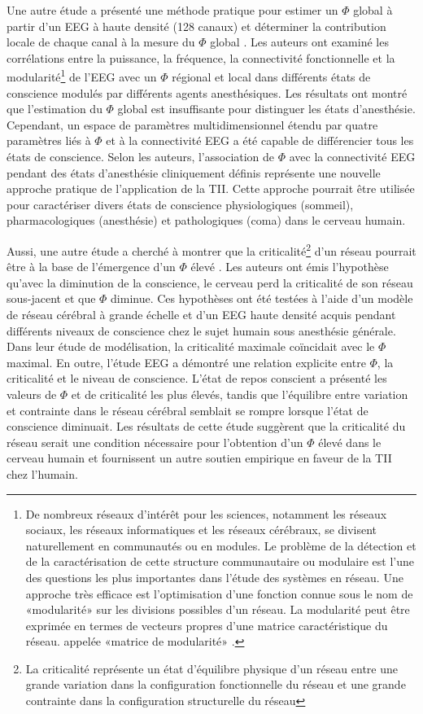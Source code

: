 Une autre étude a présenté une méthode pratique pour estimer un $\Phi$ global à partir d'un EEG à haute densité (128 canaux) et déterminer la contribution locale de chaque canal à la mesure du $\Phi$ global \citep{kim2018estimating}. 
Les auteurs ont examiné les corrélations entre la puissance, la fréquence, la connectivité fonctionnelle et la modularité\footnote{De nombreux réseaux d'intérêt pour les sciences, notamment les réseaux sociaux, les réseaux informatiques et les réseaux cérébraux, se divisent naturellement en communautés ou en modules. Le problème de la détection et de la caractérisation de cette structure communautaire ou modulaire est l'une des questions les plus importantes dans l'étude des systèmes en réseau. Une approche très efficace est l'optimisation d'une fonction connue sous le nom de «modularité» sur les divisions possibles d'un réseau. La modularité peut être exprimée en termes de vecteurs propres d'une matrice caractéristique du réseau. appelée «matrice de modularité» \citep{newman2006modularity}.} de l'EEG avec un $\Phi$ régional et local dans différents états de conscience modulés par différents agents anesthésiques. 
Les résultats ont montré que l'estimation du $\Phi$ global est insuffisante pour distinguer les états d'anesthésie. 
Cependant, un espace de paramètres multidimensionnel étendu par quatre paramètres liés à $\Phi$ et à la connectivité EEG a été capable de différencier tous les états de conscience. 
Selon les auteurs, l'association de $\Phi$ avec la connectivité EEG pendant des états d'anesthésie cliniquement définis représente une nouvelle approche pratique de l'application de la TII. 
Cette approche pourrait être utilisée pour caractériser divers états de conscience physiologiques (sommeil), pharmacologiques (anesthésie) et pathologiques (coma) dans le cerveau humain. 

Aussi, une autre étude a cherché à montrer que la criticalité\footnote{La criticalité représente un état d'équilibre physique d'un réseau entre une grande variation dans la configuration fonctionnelle du réseau et une grande contrainte dans la configuration structurelle du réseau} d'un réseau pourrait être à la base de l'émergence d'un $\Phi$ élevé \citep{kim2019criticality}. 
Les auteurs ont émis l'hypothèse qu'avec la diminution de la conscience, le cerveau perd la criticalité de son réseau sous-jacent et que $\Phi$ diminue. 
Ces hypothèses ont été testées à l'aide d'un modèle de réseau cérébral à grande échelle et d'un EEG haute densité acquis pendant différents niveaux de conscience chez le sujet humain sous anesthésie générale. 
Dans leur étude de modélisation, la criticalité maximale coïncidait avec le $\Phi$ maximal. 
En outre, l'étude EEG a démontré une relation explicite entre $\Phi$, la criticalité et le niveau de conscience. 
L'état de repos conscient a présenté les valeurs de $\Phi$ et de criticalité les plus élevés, tandis que l'équilibre entre variation et contrainte dans le réseau cérébral semblait se rompre lorsque l'état de conscience diminuait. 
Les résultats de cette étude suggèrent que la criticalité du réseau serait une condition nécessaire pour l'obtention d'un $\Phi$ élevé dans le cerveau humain et fournissent un autre soutien empirique en faveur de la TII chez l'humain. 

